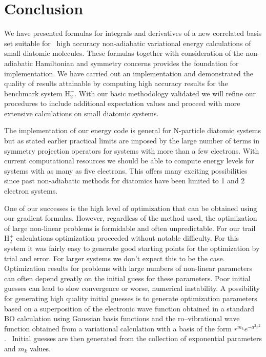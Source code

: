 \documentclass[12pt,doublespace]{article}
\begin{document}
\section{Conclusion}

We have presented formulas for integrals and derivatives of a new correlated
basis set suitable for \ high accuracy non-adiabatic variational energy
calculations of small diatomic molecules. These formulas together with
consideration of the non-adiabatic Hamiltonian and symmetry concerns
provides the foundation for implementation. We have carried out an
implementation and demonstrated the quality of results attainable by
computing high accuracy results for the benchmark system H$_{2}^{+}$.  With
our basic methodology validated we will refine our procedures to include
additional expectation values and proceed with more extensive calculations
on small diatomic systems.

The implementation of our energy code is general for N-particle diatomic
systems but as stated earlier practical limits are imposed by the large
number of terms in symmetry projection operators for systems with more than
a few electrons. With current computational resources we should be able to
compute energy levels for systems with as many as five electrons. This
offers many exciting possibilities since past non-adiabatic methods for
diatomics have been limited to 1 and 2 electron systems.

One of our successes is the high level of optimization that can be obtained
using our gradient formulas. However, regardless of the method used, the
optimization of large non-linear problems is formidable and often
unpredictable. For our trail H$_{2}^{+}$ calculations optimization proceeded
without notable difficulty. For this system it was fairly easy to generate
good starting points for the optimization by trial and error. For larger
systems we don't expect this to be the case. Optimization results for
problems with large numbers of non-linear parameters can often depend
greatly on the initial guess for these parameters. Poor initial guesses can
lead to slow convergence or worse, numerical instability.  A possibility for
generating high quality initial guesses is to generate optimization
parameters based on a superposition of the electronic wave function obtained
in a standard BO calculation using Gaussian basis functions and the
ro--vibrational wave function obtained from a variational calculation with a
basis of the form\cite{Kinghorn95} $r^{m_{k}}e^{-a^{2}r^{2}}$. \ Initial
guesses are then generated from the collection of exponential parameters and 
$m_{k}$ values.
\end{document}
